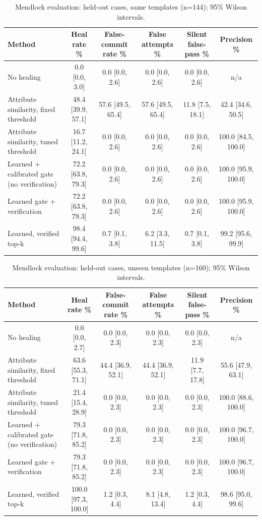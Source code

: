 \begin{table}[htbp]
  \centering
  \caption{Mendlock evaluation: held-out cases, same templates (n=144); 95\% Wilson intervals.}
  \label{tab:eval-test}
  \small
  \begin{tabular}{lccccc}
    \toprule
    \textbf{Method} & \textbf{Heal rate \%} & \textbf{False-commit rate \%} & \textbf{False attempts \%} & \textbf{Silent false-pass \%} & \textbf{Precision \%} \\
    \midrule
    No healing & 0.0 [0.0, 3.0] & 0.0 [0.0, 2.6] & 0.0 [0.0, 2.6] & 0.0 [0.0, 2.6] & n/a \\
    Attribute similarity, fixed threshold & 48.4 [39.9, 57.1] & 57.6 [49.5, 65.4] & 57.6 [49.5, 65.4] & 11.8 [7.5, 18.1] & 42.4 [34.6, 50.5] \\
    Attribute similarity, tuned threshold & 16.7 [11.2, 24.1] & 0.0 [0.0, 2.6] & 0.0 [0.0, 2.6] & 0.0 [0.0, 2.6] & 100.0 [84.5, 100.0] \\
    Learned + calibrated gate (no verification) & 72.2 [63.8, 79.3] & 0.0 [0.0, 2.6] & 0.0 [0.0, 2.6] & 0.0 [0.0, 2.6] & 100.0 [95.9, 100.0] \\
    Learned gate + verification & 72.2 [63.8, 79.3] & 0.0 [0.0, 2.6] & 0.0 [0.0, 2.6] & 0.0 [0.0, 2.6] & 100.0 [95.9, 100.0] \\
    Learned, verified top-k & 98.4 [94.4, 99.6] & 0.7 [0.1, 3.8] & 6.2 [3.3, 11.5] & 0.7 [0.1, 3.8] & 99.2 [95.6, 99.9] \\
    \bottomrule
  \end{tabular}
\end{table}

\begin{table}[htbp]
  \centering
  \caption{Mendlock evaluation: held-out cases, unseen templates (n=160); 95\% Wilson intervals.}
  \label{tab:eval-test-ood}
  \small
  \begin{tabular}{lccccc}
    \toprule
    \textbf{Method} & \textbf{Heal rate \%} & \textbf{False-commit rate \%} & \textbf{False attempts \%} & \textbf{Silent false-pass \%} & \textbf{Precision \%} \\
    \midrule
    No healing & 0.0 [0.0, 2.7] & 0.0 [0.0, 2.3] & 0.0 [0.0, 2.3] & 0.0 [0.0, 2.3] & n/a \\
    Attribute similarity, fixed threshold & 63.6 [55.3, 71.1] & 44.4 [36.9, 52.1] & 44.4 [36.9, 52.1] & 11.9 [7.7, 17.8] & 55.6 [47.9, 63.1] \\
    Attribute similarity, tuned threshold & 21.4 [15.4, 28.9] & 0.0 [0.0, 2.3] & 0.0 [0.0, 2.3] & 0.0 [0.0, 2.3] & 100.0 [88.6, 100.0] \\
    Learned + calibrated gate (no verification) & 79.3 [71.8, 85.2] & 0.0 [0.0, 2.3] & 0.0 [0.0, 2.3] & 0.0 [0.0, 2.3] & 100.0 [96.7, 100.0] \\
    Learned gate + verification & 79.3 [71.8, 85.2] & 0.0 [0.0, 2.3] & 0.0 [0.0, 2.3] & 0.0 [0.0, 2.3] & 100.0 [96.7, 100.0] \\
    Learned, verified top-k & 100.0 [97.3, 100.0] & 1.2 [0.3, 4.4] & 8.1 [4.8, 13.4] & 1.2 [0.3, 4.4] & 98.6 [95.0, 99.6] \\
    \bottomrule
  \end{tabular}
\end{table}
